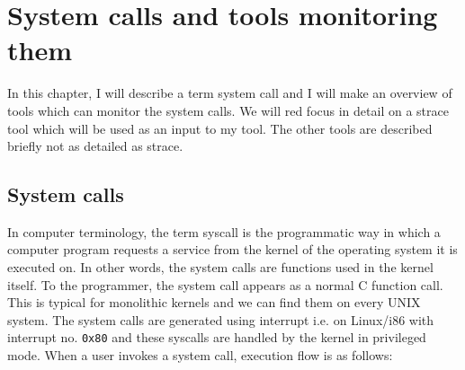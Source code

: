 \chapter{System calls and tools monitoring them}
\label{chap:syscalls}
In this chapter, I will describe a term system call and I will make an overview of tools which can monitor the system calls.
We will red focus in detail on a strace tool which will be used as an input to my tool.
The other tools are described briefly not as detailed as strace.

\section{System calls}

In computer terminology, the term syscall is the programmatic way in which a computer program requests a service from the kernel of the operating system it is executed on.
In other words, the system calls are functions used in the kernel itself.
To the programmer, the system call appears as a normal C function call.
This is typical for monolithic kernels and we can find them on every UNIX system.
The system calls are generated using interrupt i.e. on Linux/i86 with interrupt no. \texttt{0x80} and these syscalls are handled by the kernel in privileged mode.
When a user invokes a system call, execution flow is as follows:
